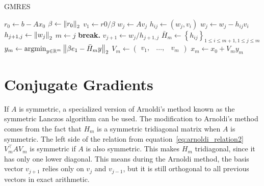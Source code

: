 \begin{algorithm}
	\caption{GMRES}\label{alg:gmres}
	\begin{algorithmic}[1]
            \State $r_0 \gets b-Ax_0$
            \State $\beta \gets \left\lVert r_0\right\rVert_2$
            \State $v_1 \gets r0/\beta$
             
                \State $w_j \gets A v_j$
                    \State $h_{ij} \gets \left(w_j, v_i\right)$
                    \State $w_j \gets w_j - h_{ij}v_i$
                \EndFor
                \State $h_{j+1, j} \gets \left\lVert w_j\right\rVert_2$
                    \State $m \gets j$
                    \State \textbf{break.}
                \EndIf
                \State $v_{j+1} \gets w_j/h_{j+1, j}$
            \EndFor
            \State $\bar{H}_m \gets \left\{h_{ij}\right\}_{1 \leq i \leq m+1, 1\leq j \leq m}$ 
            \State $y_m  \gets \operatorname*{argmin}_{y \in \mathbb{R}^m} \left\lVert\beta e_1 - \bar{H}_m y\right\rVert_2$ 
            \State $V_m \gets \begin{pmatrix}
                v_1, & \ldots, & v_m
            \end{pmatrix}$ 
            \State $x_m \gets x_0 + V_m y_m$
		\EndProcedure
	\end{algorithmic}
\end{algorithm}

\section{Conjugate Gradients}
If $A$ is symmetric, a specialized version of Arnoldi's method known as the symmetric Lanczos algorithm can be used. The modification to Arnoldi's method comes from the fact that $H_m$ is a symmetric tridiagonal matrix when $A$ is symmetric. The left side of the relation from equation~\ref{eq:arnoldi_relation2} $V^\top_m A V_m$ is symmetric if $A$ is also symmetric. This makes $H_m$ tridiagonal, since it has only one lower diagonal. This means during the Arnoldi method, the basis vector $v_{j+1}$ relies only on $v_j$ and $v_{j-1}$, but it is still orthogonal to all previous vectors in exact arithmetic.

